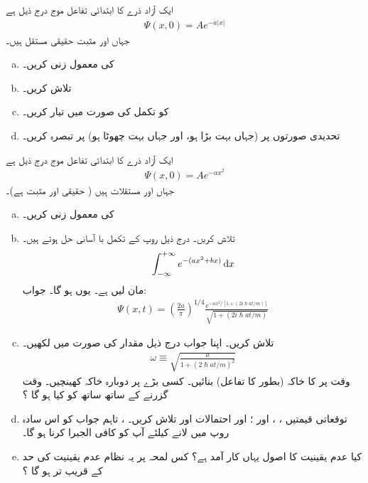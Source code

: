 ایک آزاد ذرے کا ابتدائی تفاعل موج درج ذیل ہے 
\begin{align*}
\Psi (x,0) = Ae^{ -a \left| x \right| } 
\end{align*}
جہاں  اور  مثبت حقیقی مستقل ہیں۔
\begin{enumerate}[a.]
\item 
{} کی معمول زنی کریں۔ 
\item
{} تلاش کریں۔ 
\item
{} کو تکمل کی صورت میں تیار کریں۔ 
\item
تحدیدی صورتوں پر (جہاں  بہت بڑا ہو، اور جہاں  بہت چھوٹا ہو) پر تبصرہ کریں۔ 
\end{enumerate}
 \quad {}
 ایک آزاد ذرے کا ابتدائی تفاعل موج درج ذیل ہے
\begin{align*}
\Psi(x,0) = A e^{-ax^{2}}
\end{align*}
جہاں  اور  مستقلات ہیں ( حقیقی اور مثبت ہے)۔ 
\begin{enumerate}[a.]
\item
{} کی معمول زنی کریں۔ 
\item
{} تلاش کریں۔   درج ذیل روپ کے تکمل با آسانی حل ہوتے ہیں۔ 
\begin{align*}
\int_{-\infty}^{+\infty} e^{-(ax^{2} +bx)} \dif x
\end{align*}
مان لیں  ہے۔ یوں  ہو گا۔ جواب: 
\begin{align*}
\Psi(x,t) = \left( \frac{2a}{\pi} \right) ^{1/4} \frac{e^{-ax^{2}/[1+(2i\hslash at/m)]}}{\sqrt{1+(2i\hslash at/m)}}
\end{align*}
\item
{} تلاش کریں۔ اپنا جواب درج ذیل مقدار کی صورت میں لکھیں۔ 
\begin{align*}
\omega \equiv \sqrt{\frac{a}{1+(2\hslash at/m)^{2}}}
\end{align*}
وقت  پر  کا خاکہ (بطور  کا تفاعل) بنائیں۔ کسی بڑے  پر دوبارہ خاکہ کھینچیں۔ وقت گزرنے کے ساتھ ساتھ  کو کیا ہو گا ؟
\item 
توقعاتی قیمتیں ، ،  اور ؛ اور احتمالات  اور  تلاش کریں۔
  ، تاہم جواب کو اس سادہ روپ میں لانے کیلئے آپ کو کافی الجبرا کرنا ہو گا۔ 
\item
کیا عدم یقینیت کا اصول یہاں کار آمد ہے؟ کس لمحہ  پر یہ نظام عدم یقینیت کی حد کے قریب تر ہو گا ؟
\end{enumerate}

